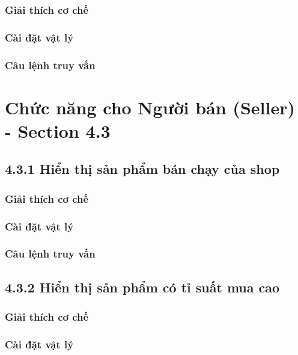 \subsubsection{Giải thích cơ chế}

\subsubsection{Cài đặt vật lý}

\subsubsection{Câu lệnh truy vấn}

\section{Chức năng cho Người bán (Seller) - Section 4.3}

\subsection{4.3.1 Hiển thị sản phẩm bán chạy của shop}

\subsubsection{Giải thích cơ chế}

\subsubsection{Cài đặt vật lý}

\subsubsection{Câu lệnh truy vấn}

\subsection{4.3.2 Hiển thị sản phẩm có tỉ suất mua cao}

\subsubsection{Giải thích cơ chế}

\subsubsection{Cài đặt vật lý}

